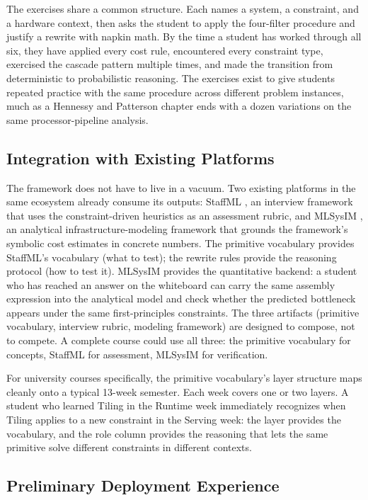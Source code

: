 \documentclass[10pt,twocolumn]{article}
\begin{document}
The exercises share a common structure. Each names a system, a constraint, and a hardware context, then asks the student to apply the four-filter procedure and justify a rewrite with napkin math. By the time a student has worked through all six, they have applied every cost rule, encountered every constraint type, exercised the cascade pattern multiple times, and made the transition from deterministic to probabilistic reasoning. The exercises exist to give students repeated practice with the same procedure across different problem instances, much as a Hennessy and Patterson chapter ends with a dozen variations on the same processor-pipeline analysis.

\subsection{Integration with Existing Platforms}
\label{sec:curriculum}

The framework does not have to live in a vacuum. Two existing platforms in the same ecosystem already consume its outputs: StaffML \citep{reddi2026staffml}, an interview framework that uses the constraint-driven heuristics as an assessment rubric, and MLSysIM \citep{reddi2026mlsysim}, an analytical infrastructure-modeling framework that grounds the framework's symbolic cost estimates in concrete numbers. The primitive vocabulary provides StaffML's vocabulary (what to test); the rewrite rules provide the reasoning protocol (how to test it). MLSysIM provides the quantitative backend: a student who has reached an answer on the whiteboard can carry the same assembly expression into the analytical model and check whether the predicted bottleneck appears under the same first-principles constraints. The three artifacts (primitive vocabulary, interview rubric, modeling framework) are designed to compose, not to compete. A complete course could use all three: the primitive vocabulary for concepts, StaffML for assessment, MLSysIM for verification.

For university courses specifically, the primitive vocabulary's layer structure maps cleanly onto a typical 13-week semester. Each week covers one or two layers. A student who learned Tiling in the Runtime week immediately recognizes when Tiling applies to a new constraint in the Serving week: the layer provides the vocabulary, and the role column provides the reasoning that lets the same primitive solve different constraints in different contexts.

\subsection{Preliminary Deployment Experience}
\label{sec:deployment}
\end{document}
